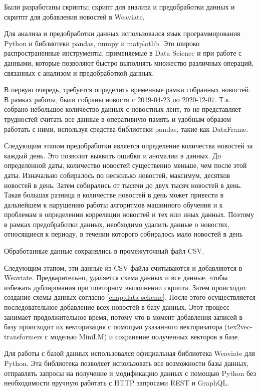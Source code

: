 Были разработаны скрипты: скрипт для анализа и предобработки данных и скритпт для добавления новостей в Weaviate.

Для анализа и предобработки данных использовался язык программирования Python и библиотеки pandas, numpy и matplotlib. Это широко распространенные инструменты, применяемые в Data Science и при работе с данными, которые позволяют быстро выполнять множество различных операций, связанных с анализом и предобработкой данных.

В первую очередь, требуется определить временные рамки собранных новостей. В рамках работы, были собраны новости с 2019-04-23 по 2020-12-07. Т.к. собрано небольшое количество данных с новостных лент, то не представляет трудностей считать все данные в оперативную память и удобным образом работать с ними, используя средства библиотеки pandas, такие как DataFrame.

Следующим этапом предобработки является определение количества новостей за каждый день. Это позволит выявить ошибки и аномалии в данных.  До определенной даты, количество новостей существенно меньше, чем после этой даты. Изначально собиралось по несколько новостей, максимум, десятков новостей в день. Затем собирались от тысячи до двух тысяч новостей в день. Такая большая разница в количестве новостей в день может привести в дальнейшем к нарушению работы алгоритмов машинного обучения и к проблемам в определении корреляции новостей и тех или иных данных. Поэтому в рамках предобработки данных, необходимо удалить данные о новостях, относящиеся к периоду, в течении которого собиралось мало новостей в день

Обработанные данные сохранялись в промежуточный файл CSV.

Следующим этапом, эти данные из CSV файла считываются и добавляются в Weaviate. Предварительно, удаляется схема данных и все данные, чтобы избежать дублирования при повторном выполнении скрипта. Затем происходит создание схемы данных согласно \ref{chap:data-scheme}. После этого осуществляется последовательное добавление всех новостей в базу данных. Этот процесс занимает продолжительное время, потому что в момент добавления записей в базу происходит их векторизация с помощью указанного векторизатора (tex2vec-transformers с моделью MiniLM) и сохранение полученных векторов в базе.

Для работы с базой данных использовался официальная библиотека Weaviate для Python. Эта библиотека позволяет использовать все возможности базы данных, отправлять запросы на получение и модификацию данных с помощью Python без необходимости вручную работать с HTTP запросами REST и GraphQL.

